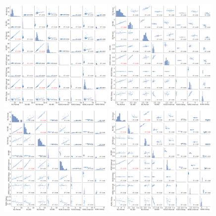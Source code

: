 \begin{figure}[htbp]
	\centering
	\includegraphics[width=0.49\textwidth]{./img/invariants/data/SUSSEX/prep2/images/2phases/_output_pairplot_reset.png}
	\includegraphics[width=0.49\textwidth]{./img/invariants/data/SUSSEX/SO_driven/images/_output_pairplot_reset.png}
	\includegraphics[width=0.49\textwidth]{./img/invariants/data/SUSSEX/MLN_driven/images/_output_pairplot_reset.png}
	\includegraphics[width=0.49\textwidth]{./img/invariants/data/SUSSEX/CV1a_driven1/images/2phases/_output_pairplot_reset.png}

\end{figure}

